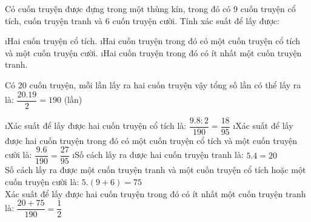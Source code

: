 \begin{bt}
	Có cuốn truyện được đựng trong một thùng kín, trong đó có 9 cuốn truyện cổ tích, cuốn truyện tranh và 6 cuốn truyện cười. Tính xác suất để lấy được:
	\begin{enumerate}[a),leftmargin=*]
		\i Hai cuốn truyện cổ tích.
		\i Hai cuốn truyện trong đó có một cuốn truyện cổ tích và một cuốn truyện cười.
		\i Hai cuốn truyện trong đó có ít nhất một cuốn truyện tranh.
	\end{enumerate}
	\begin{loigiaichuong41}
		Có 20 cuốn truyện, mỗi lần lấy ra hai cuốn truyện vậy tổng số lần có thể lấy ra là:  $\dfrac{20.19}{2}= 190$ (lần)
		\begin{enumerate}[a),leftmargin=*]
			\i Xác suất để lấy được hai cuốn truyện cổ tích là: $\dfrac{{9.8:2}}{{190}} = \dfrac{{18}}{{95}}$  
			\i Xác suất để lấy được hai cuốn truyện trong đó có một cuốn truyện cổ tích và một cuốn truyện cười là:  $\dfrac{{9.6}}{{190}} = \dfrac{{27}}{{95}}$
			\i Số cách lấy ra được hai cuốn truyện tranh là:  $5.4 = 20$\\
			Số cách lấy ra được một cuốn truyện tranh và một cuốn truyện cổ tích hoặc một cuốn truyện cười là:  $5.\left( {9 + 6} \right) = 75$\\
			Xác suất để lấy được hai cuốn truyện trong đó có ít nhất một cuốn truyện tranh là:  $\dfrac{{20 + 75}}{{190}} = \dfrac{1}{2}$
		\end{enumerate}
	\end{loigiaichuong41}
\end{bt}
